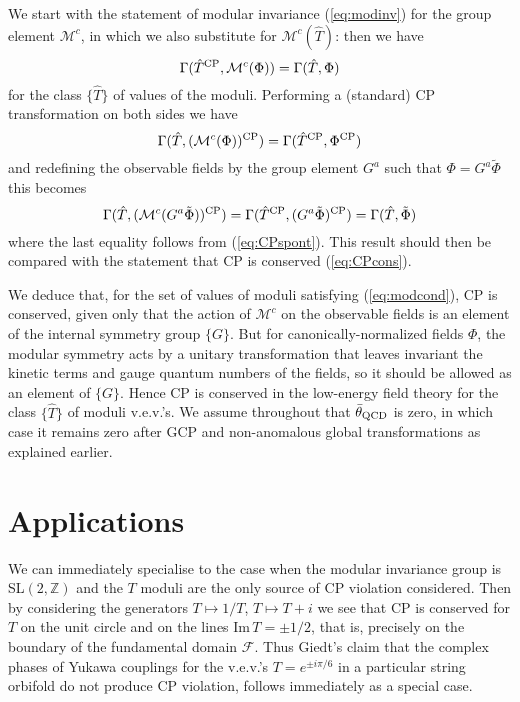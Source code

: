 \documentclass[a4paper,12pt]{article}
\begin{document}
We start with the statement of modular invariance (\ref{eq:modinv}) for the group element $\mathcal{M}^c$, in which we also substitute for $\mathcal{M}^{c}(\hat{T})$: then we have 
\begin{equation}
\Gamma(\hat{T}^{\rm CP},\mathcal{M}^{c}(\Phi)) = \Gamma(\hat{T},\Phi)
\end{equation}
for the class $\{ \hat{T}\}$ of values of the moduli.
Performing a (standard) CP transformation on both sides we have
\begin{equation}
\Gamma(\hat{T},(\mathcal{M}^{c}(\Phi))^{\rm CP}) = \Gamma(\hat{T}^{\rm CP},\Phi^{\rm CP})
\end{equation}
and redefining the observable fields by the group element $G^a$ such that $\Phi=G^a\tilde{\Phi}$ this becomes
\begin{equation}
\Gamma(\hat{T},(\mathcal{M}^{c}(G^a\tilde{\Phi}))^{\rm CP}) = \Gamma(\hat{T}^{\rm CP},(G^a\tilde{\Phi})^{\rm CP}) = \Gamma(\hat{T},\tilde{\Phi})
\end{equation}
where the last equality follows from (\ref{eq:CPspont}). This result should then be compared with the statement that CP is conserved (\ref{eq:CPcons}).

We deduce that, for the set of values of moduli satisfying (\ref{eq:modcond}), CP is conserved, given only that the action of $\mathcal{M}^{c}$ on the observable fields is an element of the internal symmetry group $\{G\}$. But for canonically-normalized fields $\Phi$, the modular symmetry acts by a unitary transformation that leaves invariant the kinetic terms and gauge quantum numbers of the fields, so it should be allowed as an element of $\{G\}$. Hence CP is conserved in the low-energy field theory for the class $\{\hat{T}\}$ of moduli v.e.v.'s. We assume throughout that $\bar{\theta}_{\rm QCD}$ is zero, in which case it remains zero after GCP and non-anomalous global transformations as explained earlier.

\section{Applications} 
We can immediately specialise to the case when the modular invariance group is SL$(2,\mathbb{Z})$ and the $T$ moduli are the only source of CP violation considered. Then by considering the generators $T\mapsto 1/T$, $T\mapsto T+i$ we see that CP is conserved for $T$ on the unit circle and on the lines Im$\,T=\pm 1/2$, that is, precisely on the boundary of the fundamental domain $\mathcal{F}$.
Thus Giedt's claim \cite{Giedt2000} that the complex phases of Yukawa couplings for the v.e.v.'s $T=e^{\pm i\pi/6}$ in a particular string orbifold do not produce CP violation, follows immediately as a special case. 
\end{document}
